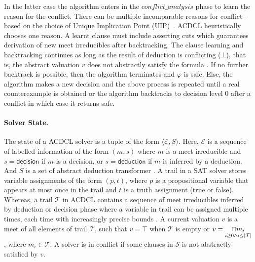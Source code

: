 In the latter case the algorithm enters in the
$\mathit{conflict\_analysis}$ phase to learn the reason for the
conflict.  There can be multiple incomparable reasons for conflict --
based on the choice of Unique Implication Point (UIP)~\cite{cdcl}.
ACDCL heuristically chooses one reason.  A learnt clause must include
asserting cuts which guarantees derivation of new meet irreducibles
after backtracking. The clause learning and backtracking continues as
long as the result of deduction is conflicting ($\bot$), that is, the
abstract valuation $v$ does not abstractly satisfy the formula
.  If no further backtrack is possible, then the
algorithm terminates and $\varphi$ is \textsf{safe}. Else, the
algorithm makes a new decision and the above process is repeated until
a real counterexample  is obtained or the
algorithm backtracks to decision level 0 after a conflict in which
case it returns \textsf{safe}.

\paragraph{Solver State.}   The state of a ACDCL solver is a tuple 
of the form $\langle \mathcal{E}, S \rangle$.  Here, $\mathcal{E}$ 
is a sequence of labelled information of the form $(m,s)$ where 
$m$ is a meet irreducible and $s = \mathsf{decision}$ if $m$ is a decision, 
or $s = \mathsf{deduction}$ if $m$ is inferred by a deduction. And $S$ is 
a set of abstract deduction transformer .  A trail in a SAT solver 
stores variable assignments of the form $(p, t)$, where $p$ is 
a propositional variable that appears at most once in the trail 
and $t$ is a truth assignment (true or false).  Whereas, a trail 
$\mathcal{T}$ in ACDCL contains a sequence of meet irreducibles 
inferred by deduction or decision phase where a variable in trail 
can be assigned  multiple times, each time with increasingly precise 
bounds .  A current valuation $v$ is a meet of all elements of trail
$\mathcal{T}$, such that $v = \top$ when $\mathcal{T}$ is 
empty or $v=\underset{i \geq 0 \wedge i \leq |\mathcal{T}|}{\sqcap m_i}$, where 
$m_i \in \mathcal{T}$.  A solver is in conflict if some clauses in
$\mathcal{S}$ is not abstractly satisfied by $v$.

